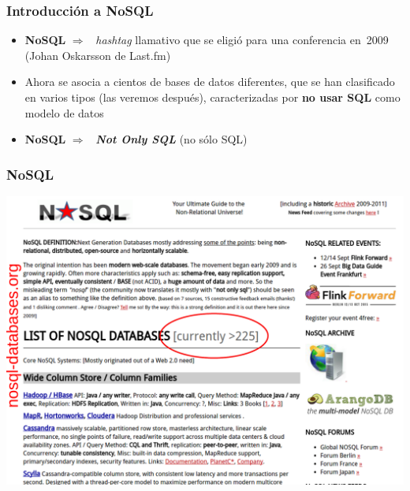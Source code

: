 \documentclass[14pt]{beamer}
\newcommand{\ra}{{\color{blue} $\Rightarrow${}~{}}}
\begin{document}
\begin{frame}
  \frametitle{Introducción a NoSQL}
\begin{itemize}
\item {\bf NoSQL} \ra{} {\em hashtag\/} llamativo que se
  eligió para una conferencia en~2009 (Johan Oskarsson de Last.fm)
\item Ahora se asocia a cientos de bases de datos diferentes,
  que se han clasificado en varios tipos (las veremos después),
  caracterizadas por {\bf no usar SQL} como modelo de datos
\item {\bf NoSQL} \ra{} {\bfseries\itshape Not Only SQL} (no sólo SQL)
  \end{itemize}
\end{frame}

\begin{frame}
  \frametitle{NoSQL}
\centering\includegraphics[width=\textwidth]{img/nosqldatabases3}
\end{frame}
\end{document}
